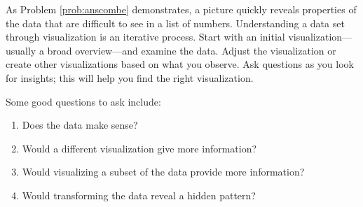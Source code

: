 As Problem \ref{prob:anscombe} demonstrates, a picture quickly reveals properties of the data that are difficult to see in a list of numbers.
Understanding a data set through visualization is an iterative process.
Start with an initial visualization---usually a broad overview---and examine the data.
Adjust the visualization or create other visualizations based on what you observe.
Ask questions as you look for insights; this will help you find the right visualization.

Some good questions to ask include:
\begin{enumerate}
\item Does the data make sense?
\item Would a different visualization give more information?
\item Would visualizing a subset of the data provide more information?
\item Would transforming the data reveal a hidden pattern?
\end{enumerate}

